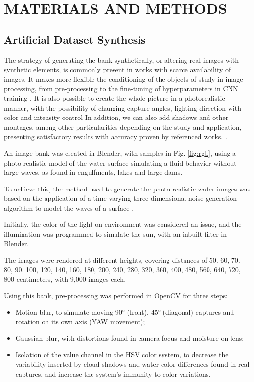 \section{MATERIALS AND METHODS}

\subsection{Artificial Dataset Synthesis}
    The strategy of generating the bank synthetically, or altering real images with synthetic elements, is commonly present in works with scarce availability of images.
    It makes more flexible the conditioning of the objects of study in image processing, from pre-processing to the fine-tuning of hyperparameters in CNN training \cite{BlenderSmoke} \cite{BlurFiducial} \cite{ObjetoSintetico}. 
    It is also possible to create the whole picture in a photorealistic manner, with the possibility of changing capture angles, lighting direction with color and intensity control
    In addition, we can also add shadows and other montages, among other particularities depending on the study and application, presenting satisfactory results with accuracy proven by referenced works. \cite{TurbineBlur} \cite{BlenderMapa}.

	An image bank was created in Blender, with samples in Fig. \ref{fig:rgb}, using a photo realistic model of the water surface simulating a fluid behavior without large waves, as found in engulfments, lakes and large dams.
	
	To achieve this, the method used to generate the photo realistic water images was based on the application of a time-varying three-dimensional noise generation algorithm to model the waves of a surface \cite{OndaR} \cite{OndaDeep}. 
	
	Initially, the color of the light on environment was considered an issue, and the illumination was programmed to simulate the sun, with an inbuilt filter in Blender.
	
	The images were rendered at different heights, covering distances of 50, 60, 70, 80, 90, 100, 120, 140, 160, 180, 200, 240, 280, 320, 360, 400, 480, 560, 640, 720, 800 centimeters, with 9,000 images each.
	
	Using this bank, pre-processing was performed in OpenCV for three steps:
	\begin{itemize}
	    \item Motion blur, to simulate moving 90° (front), 45° (diagonal) captures and rotation on its own axis (YAW movement);
	    \item  Gaussian blur, with distortions found in camera focus and moisture on lens;
    	\item Isolation of the value channel in the HSV color system, to decrease the variability inserted by cloud shadows and water color differences found in real captures, and increase the system's immunity to color variations.
	\end{itemize}
	
